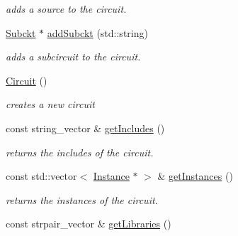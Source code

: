 \begin{DoxyCompactItemize}
\begin{DoxyCompactList}\small\item\em adds a source to the circuit. \end{DoxyCompactList}\item 
\hyperlink{class_s_p_i_c_e_1_1_subckt}{Subckt} $\ast$ \hyperlink{class_s_p_i_c_e_1_1_circuit_a0d1352e46d4537ce1e5f651de40e91a6}{add\-Subckt} (std\-::string)
\begin{DoxyCompactList}\small\item\em adds a subcircuit to the circuit. \end{DoxyCompactList}\item 
\hypertarget{class_s_p_i_c_e_1_1_circuit_a2210ebc37eee536dbe9b44a89690256c}{\hyperlink{class_s_p_i_c_e_1_1_circuit_a2210ebc37eee536dbe9b44a89690256c}{Circuit} ()}\label{class_s_p_i_c_e_1_1_circuit_a2210ebc37eee536dbe9b44a89690256c}

\begin{DoxyCompactList}\small\item\em creates a new circuit \end{DoxyCompactList}\item 
\hypertarget{class_s_p_i_c_e_1_1_circuit_a312beaf640e84589e6644820355c8ed6}{const string\-\_\-vector \& \hyperlink{class_s_p_i_c_e_1_1_circuit_a312beaf640e84589e6644820355c8ed6}{get\-Includes} ()}\label{class_s_p_i_c_e_1_1_circuit_a312beaf640e84589e6644820355c8ed6}

\begin{DoxyCompactList}\small\item\em returns the includes of the circuit. \end{DoxyCompactList}\item 
\hypertarget{class_s_p_i_c_e_1_1_circuit_a8e6e58ffab876152a740092520c35d73}{const std\-::vector$<$ \hyperlink{class_s_p_i_c_e_1_1_instance}{Instance} $\ast$ $>$ \& \hyperlink{class_s_p_i_c_e_1_1_circuit_a8e6e58ffab876152a740092520c35d73}{get\-Instances} ()}\label{class_s_p_i_c_e_1_1_circuit_a8e6e58ffab876152a740092520c35d73}

\begin{DoxyCompactList}\small\item\em returns the instances of the circuit. \end{DoxyCompactList}\item 
\hypertarget{class_s_p_i_c_e_1_1_circuit_a3e6a71a711e4796470f1a2a1dc42aef6}{const strpair\-\_\-vector \& \hyperlink{class_s_p_i_c_e_1_1_circuit_a3e6a71a711e4796470f1a2a1dc42aef6}{get\-Libraries} ()}\label{class_s_p_i_c_e_1_1_circuit_a3e6a71a711e4796470f1a2a1dc42aef6}


\end{DoxyCompactItemize}
